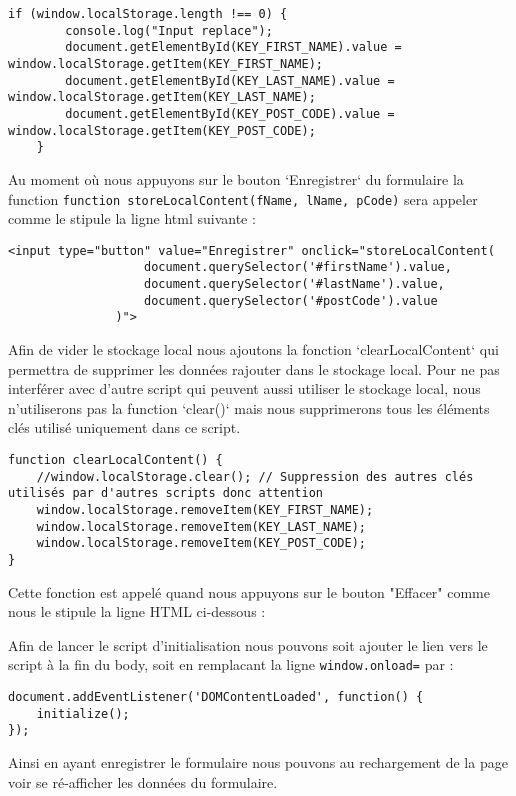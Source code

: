 \begin{verbatim}
if (window.localStorage.length !== 0) {
        console.log("Input replace");
        document.getElementById(KEY_FIRST_NAME).value = window.localStorage.getItem(KEY_FIRST_NAME);
        document.getElementById(KEY_LAST_NAME).value = window.localStorage.getItem(KEY_LAST_NAME);
        document.getElementById(KEY_POST_CODE).value = window.localStorage.getItem(KEY_POST_CODE);
    }
\end{verbatim}

Au moment où nous appuyons sur le bouton `Enregistrer` du formulaire la function \texttt{function storeLocalContent(fName, lName, pCode)} sera appeler comme le stipule la ligne html suivante :
\begin{verbatim}
<input type="button" value="Enregistrer" onclick="storeLocalContent(
                   document.querySelector('#firstName').value,
                   document.querySelector('#lastName').value,
                   document.querySelector('#postCode').value
               )">
\end{verbatim}


Afin de vider le stockage local nous ajoutons la fonction `clearLocalContent` qui permettra de supprimer les données rajouter dans le stockage local.
Pour ne pas interférer avec d'autre script qui peuvent aussi utiliser le stockage local, nous n'utiliserons pas la function `clear()` mais nous supprimerons tous les éléments clés utilisé uniquement dans ce script.

\begin{verbatim}
function clearLocalContent() {
    //window.localStorage.clear(); // Suppression des autres clés utilisés par d'autres scripts donc attention
    window.localStorage.removeItem(KEY_FIRST_NAME);
    window.localStorage.removeItem(KEY_LAST_NAME);
    window.localStorage.removeItem(KEY_POST_CODE);
}
\end{verbatim}
Cette fonction est appelé quand nous appuyons sur le bouton "Effacer" comme nous le stipule la ligne HTML ci-dessous :

Afin de lancer le script d'initialisation nous pouvons soit ajouter le lien vers le script à la fin du body, soit en remplacant la ligne \texttt{window.onload=} par :
\begin{verbatim}
document.addEventListener('DOMContentLoaded', function() {
    initialize();
});
\end{verbatim}

Ainsi en ayant enregistrer le formulaire nous pouvons au rechargement de la page voir se ré-afficher les données du formulaire.

